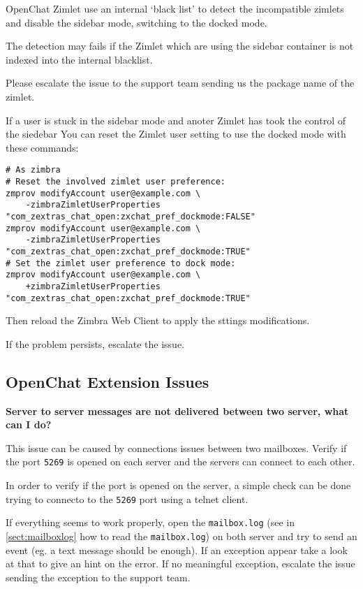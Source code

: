         OpenChat Zimlet use an internal `black list' to detect the incompatible zimlets and disable the sidebar mode, switching
        to the docked mode.

        The detection may fails if the Zimlet which are using the sidebar container is not indexed into the internal
        blacklist.

        Please escalate the issue to the support team sending us the package name of the zimlet.

        If a user is stuck in the sidebar mode and anoter Zimlet has took the control of the siedebar You can reset the
        Zimlet user setting to use the docked mode with these commands:
        \begin{verbatim}
# As zimbra
# Reset the involved zimlet user preference:
zmprov modifyAccount user@example.com \
    -zimbraZimletUserProperties "com_zextras_chat_open:zxchat_pref_dockmode:FALSE"
zmprov modifyAccount user@example.com \
    -zimbraZimletUserProperties "com_zextras_chat_open:zxchat_pref_dockmode:TRUE"
# Set the zimlet user preference to dock mode:
zmprov modifyAccount user@example.com \
    +zimbraZimletUserProperties "com_zextras_chat_open:zxchat_pref_dockmode:TRUE"
        \end{verbatim}

        Then reload the Zimbra Web Client to apply the sttings modifications.

        If the problem persists, escalate the issue.

    \subsection[Extension Issues]{OpenChat Extension Issues}

    \textbf{Server to server messages are not delivered between two server, what can I do?}

        This issue can be caused by connections issues between two mailboxes. Verify if the port \verb+5269+ is opened on
        each server and the servers can connect to each other.

        In order to verify if the port is opened on the server, a simple check can be done trying to connecto to the \verb+5269+
        port using a telnet client.

        If everything seems to work properly, open the \verb+mailbox.log+ (see in \autoref{sect:mailboxlog} how to read
        the \verb+mailbox.log+) on both server and try to send an event (eg. a text message should be enough). If an
        exception appear take a look at that to give an hint on the error. If no meaningful exception, escalate the issue
        sending the exception to the support team.

